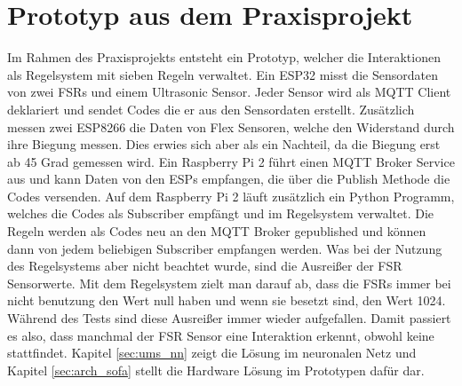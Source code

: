 \section{Prototyp aus dem Praxisprojekt}
Im Rahmen des Praxisprojekts entsteht ein Prototyp, welcher die Interaktionen als Regelsystem mit sieben Regeln verwaltet. Ein ESP32 misst die Sensordaten von zwei FSRs und einem Ultrasonic Sensor. Jeder Sensor wird als MQTT Client deklariert und sendet Codes die er aus den Sensordaten erstellt. Zusätzlich messen zwei ESP8266 die Daten von Flex Sensoren, welche den Widerstand durch ihre Biegung messen. Dies erwies sich aber als ein Nachteil, da die Biegung erst ab 45 Grad gemessen wird. Ein Raspberry Pi 2 führt einen MQTT Broker Service aus und kann Daten von den ESPs empfangen, die über die Publish Methode die Codes versenden. Auf dem Raspberry Pi 2 läuft zusätzlich ein Python Programm, welches die Codes als Subscriber empfängt und im Regelsystem verwaltet. Die Regeln werden als Codes neu an den MQTT Broker gepublished und können dann von jedem beliebigen Subscriber empfangen werden. \citep{Schroeder2019} 
\newline
Was bei der Nutzung des Regelsystems aber nicht beachtet wurde, sind die Ausreißer der FSR Sensorwerte. Mit dem Regelsystem zielt man darauf ab, dass die FSRs immer bei nicht benutzung den Wert null haben und wenn sie besetzt sind, den Wert 1024. Während des Tests sind diese Ausreißer immer wieder aufgefallen. Damit passiert es also, dass manchmal der FSR Sensor eine Interaktion erkennt, obwohl keine stattfindet.
Kapitel \ref{sec:ums_nn} zeigt die Lösung im neuronalen Netz und Kapitel \ref{sec:arch_sofa} stellt die Hardware Lösung im Prototypen dafür dar.